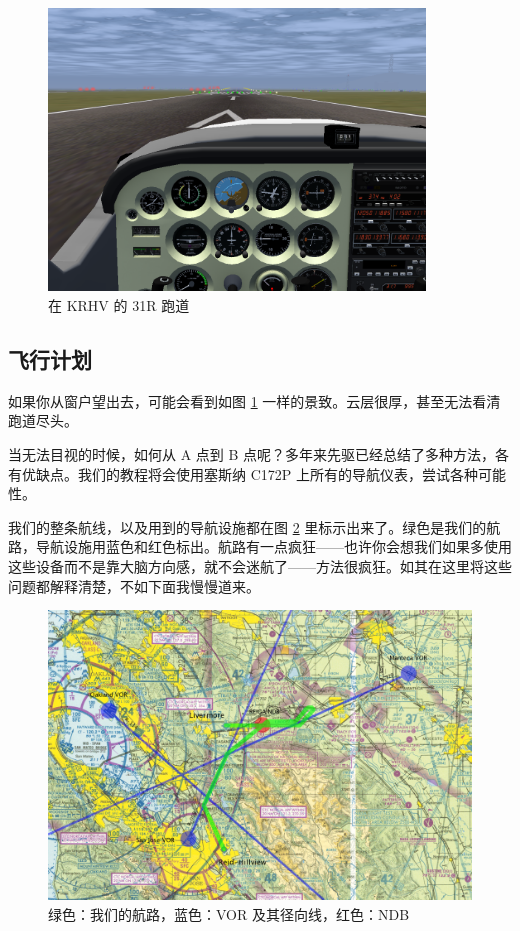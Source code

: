 \begin{figure}
  \begin{center}
    \includegraphics[width=10cm]{img/KRHV}
    \caption{在 KRHV 的 31R 跑道}
    \label{fig:KRHV}
  \end{center}
\end{figure}

\subsection{飞行计划}

如果你从窗户望出去，可能会看到如图 \ref{fig:KRHV} 一样的景致。云层很厚，甚至无法看清跑道尽头。

当无法目视的时候，如何从 A 点到 B 点呢？多年来先驱已经总结了多种方法，各有优缺点。我们的教程将会使用塞斯纳 C172P 上所有的导航仪表，尝试各种可能性。

我们的整条航线，以及用到的导航设施都在图 \ref{fig:sectional_labelled} 里标示出来了。绿色是我们的航路，导航设施用蓝色和红色标出。航路有一点疯狂——也许你会想我们如果多使用这些设备而不是靠大脑方向感，就不会迷航了——方法很疯狂。如其在这里将这些问题都解释清楚，不如下面我慢慢道来。

\begin{figure}
  \begin{center}
    \includegraphics[width=20cm, angle=-90]{img/sectional_labelled}
    \caption{绿色：我们的航路，蓝色：VOR 及其径向线，红色：NDB}
    \label{fig:sectional_labelled}
  \end{center}
\end{figure}

